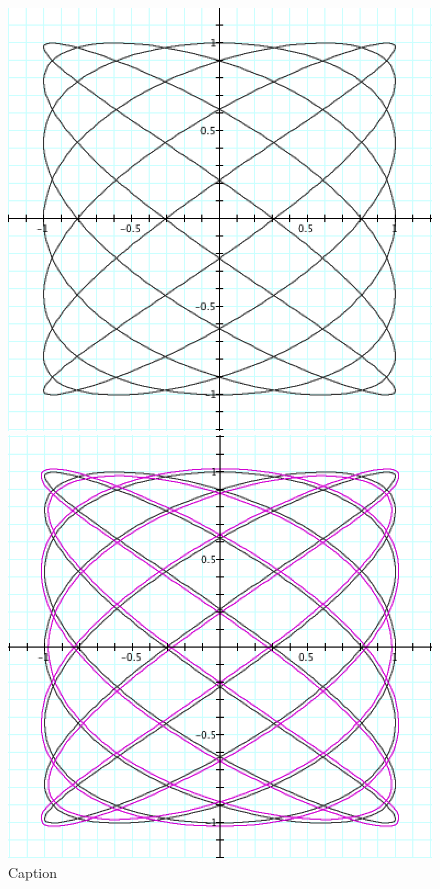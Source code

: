 \begin{figure}[H] 
  \label{polar-1} 
  \centering
  \begin{minipage}[b]{0.4\linewidth}
    \centering
    \includegraphics[width=.9\linewidth]{parametric-polar-img/Fig 30.png} 
    \caption{Caption} 
    \label{fig:fig30}
    \vspace{4ex}
  \end{minipage} %
  \begin{minipage}[b]{0.4\linewidth}
    \centering
    \includegraphics[width=.9\linewidth]{parametric-polar-img/Fig 31.png} 

\end{minipage}
\end{figure}
